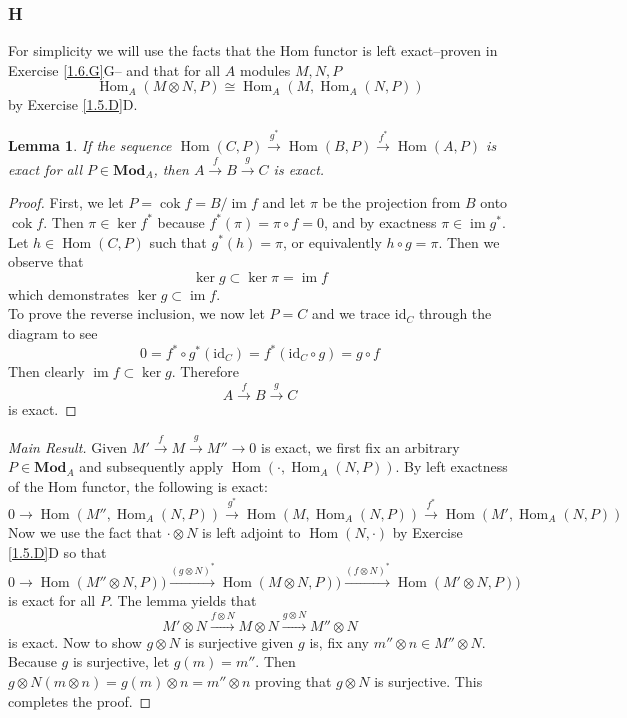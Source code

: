 \documentclass{article}
\newcommand{\id}{\mathrm{id}}
\DeclareMathOperator{\im}{im}
\DeclareMathOperator{\cok}{cok}
\DeclareMathOperator{\Hom}{Hom}
\newcommand{\Mod}{\mathbf{Mod}} %
\newtheorem*{lemma*}{Lemma}
\begin{document}
\subsubsection{H}\label{1.3.H}
    For simplicity we will use the facts that the Hom functor is left exact--proven in Exercise \ref{1.6.G}G-- and that for all $A$ modules $M,N,P$
    \[
    \Hom_A(M\otimes N,P)\cong \Hom_A(M,\Hom_A(N,P))
    \]
by Exercise \ref{1.5.D}D. 
\begin{lemma*}
If the sequence $\Hom(C,P)\xrightarrow{g^*}\Hom(B,P)\xrightarrow{f^*}\Hom(A,P)$ is exact for all $P\in \Mod_A$, then $A\xrightarrow{f}B\xrightarrow{g}C$ is exact.
\cite{tensorRexact}
\end{lemma*}
\begin{proof}
    First, we let $P=\cok f=B/ \im f$ and let $\pi$ be the projection from $B$ onto $\cok f$. Then $\pi\in \ker f^*$ because $f^*(\pi)=\pi\circ f=0$, and by exactness $\pi\in \im g^*$. Let $h\in \Hom(C,P)$ such that $g^*(h)=\pi$, or equivalently $h\circ g=\pi$. Then we observe that
    \[
    \ker g\subset \ker \pi=\im f
    \]
    which demonstrates $\ker g\subset \im f$.\\
    To prove the reverse inclusion, we now let $P=C$ and we trace $\id_C$ through the diagram to see
    \[
    0=f^*\circ g^*(\id_C)=f^*(\id_C\circ g)=g\circ f
    \]
    Then clearly $\im f\subset \ker g$. Therefore
    \[
    A\xrightarrow{f}B\xrightarrow{g}C
    \]
    is exact.
\end{proof}
\begin{proof}[Main Result]
    Given $M'\xrightarrow{f} M\xrightarrow{g} M''\to 0$ is exact, we first fix an arbitrary $P\in \Mod_A$ and subsequently apply $\Hom(\cdot,\Hom_A(N,P))$. By left exactness of the Hom functor, the following is exact:
    \[
    0\to \Hom(M'',\Hom_A(N,P))\xrightarrow{g^*} \Hom(M,\Hom_A(N,P))\xrightarrow{f^*} \Hom(M',\Hom_A(N,P))
    \]
    Now we use the fact that $\cdot \otimes N$ is left adjoint to $\Hom(N,\cdot)$ by Exercise \ref{1.5.D}D so that
    \[
    0\to \Hom(M''\otimes N,P))\xrightarrow{(g\otimes N)^*} \Hom(M\otimes N,P))\xrightarrow{(f\otimes N)^*} \Hom(M'\otimes N,P))
    \]
    is exact for all $P$. The lemma yields that
    \[
    M'\otimes N\xrightarrow{f\otimes N} M\otimes N\xrightarrow{g\otimes N}M''\otimes N
    \]
    is exact. Now to show $g\otimes N$ is surjective given $g$ is, fix any $m''\otimes n\in M''\otimes N$. Because $g$ is surjective, let $g(m)=m''$. Then $g\otimes N(m\otimes n)=g(m)\otimes n=m''\otimes n$ proving that $g\otimes N$ is surjective. This completes the proof.
\end{proof}
\end{document}
